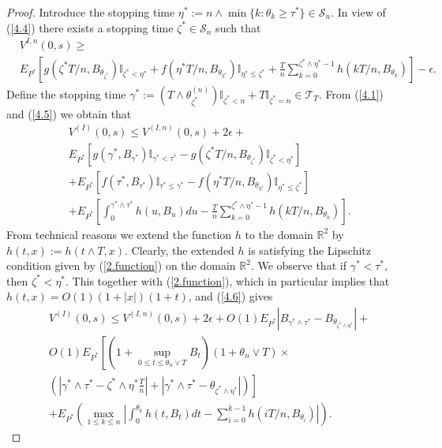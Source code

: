 \documentclass{amsart}
\numberwithin{equation}{section}
\begin{document}
\begin{proof}
Introduce the stopping time $\eta^*:=n\wedge\min\{k:\theta_k\geq\tau^*\}\in\mathcal S_n$.
In view of (\ref{4.4}) there exists a stopping time
$\zeta^*\in\mathcal S_n$ such that
\begin{eqnarray}\label{4.5}
&V^{I,n}(0,s)\geq\\
&E_{P^*}\left[g(\zeta^* T/n,B_{\theta_{\zeta^*}})\mathbb{I}_{\zeta^*<\eta^*}
+f(\eta^* T/n,B_{\theta_{\eta^*}})\mathbb{I}_{\eta^*\leq\zeta^*}+\frac{T}{n}\sum_{k=0}^{\zeta^*\wedge\eta^*-1} h(k T/n,B_{\theta_k})\right]-\epsilon.\nonumber
\end{eqnarray}
Define the stopping time
$\gamma^*:=(T\wedge\theta^{(n)}_{\zeta^*})\mathbb{I}_{\zeta^*<n}+T\mathbb{I}_{\zeta^*=n}\in\mathcal T_T$.
From (\ref{4.1}) and (\ref{4.5}) we obtain that
\begin{eqnarray}\label{4.6}
&V^{(I)}(0,s)\leq V^{(I,n)}(0,s)+2\epsilon+\\
& E_{P^*}[g(\gamma^*,B_{\gamma^*})\mathbb{I}_{\gamma^*<\tau^*}-g(\zeta^* T/n,B_{\theta_{\zeta^*}})\mathbb{I}_{\zeta^*<\eta^*}]\nonumber\\
&+E_{P^*}[f(\tau^*,B_{\tau^*})\mathbb{I}_{\tau^*\leq\gamma^*}
-f(\eta^* T/n,B_{\theta_{\eta^*}})\mathbb{I}_{\eta^*\leq\zeta^*}]\nonumber\\
&+\nonumber E_{P^*}[\int_{0}^{\gamma^*\wedge\tau^*}h(u, B_{u})du-\frac{T}{n}\sum_{k=0}^{\zeta^*\wedge\eta^*-1} h(k T/n,B_{\theta_k})].\nonumber
\end{eqnarray}
From technical reasons we extend the function $h$ to the domain $\mathbb R^2$ by
$h(t,x):=h(t\wedge T,x)$. Clearly, the extended $h$ is satisfying the Lipschitz condition given
by (\ref{2.function}) on the domain $\mathbb R^2$.
We observe that if $\gamma^*<\tau^*$, then $\zeta^*<\eta^*$. This together with (\ref{2.function}),
which in particular implies that $h(t,x)=O(1)(1+|x|)(1+t)$,
and (\ref{4.6})
gives
\begin{eqnarray}\label{4.7}
&V^{(I)}(0,s)\leq V^{(I,n)}(0,s)+2\epsilon+O(1)E_{P^*}|B_{\gamma^*\wedge\tau^*}-B_{\theta_{\zeta^*\wedge\eta^*}}|+\\
&O(1)E_{P^*}\left[(1+\sup_{0\leq t\leq\theta_n\vee T} B_t)(1+\theta_n\vee T)\times\right.\nonumber\\
&\left.(|\gamma^*\wedge\tau^*-\zeta^*\wedge\eta^*\frac{T}{n}|+|\gamma^*\wedge\tau^*-\theta_{\zeta^*\wedge\eta^*}|)\right]\nonumber\\
&+E_{P^*}\left(\max_{1\leq k\leq n}\left|\int_{0}^{\theta_k} h(t,B_t)dt-\sum_{i=0}^{k-1} h(i T/n, B_{\theta_i})\right|\right).\nonumber
\end{eqnarray}

\end{proof}
\end{document}

